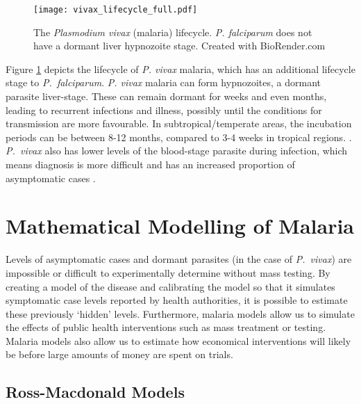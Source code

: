 \begin{figure}[htbp]
    \centering
    \texttt{[image: vivax\_lifecycle\_full.pdf]}
    \caption[{
        \emph{Plasmodium vivax} lifecycle
    }]{
        The \emph{Plasmodium vivax} (malaria) lifecycle. \emph{P. falciparum}
        does not have a dormant liver hypnozoite stage. Created with
        BioRender.com
    }
    \label{fig:mal_lc}
\end{figure}

Figure \ref{fig:mal_lc} depicts the lifecycle of \emph{P. vivax} malaria,
which has an additional lifecycle stage 
to \textit{P.\ falciparum}. \emph{P. vivax} malaria can form
hypnozoites, a
dormant parasite liver-stage. These can remain dormant for weeks and
even months, leading to recurrent infections and illness, possibly until the
conditions for transmission are more favourable. In subtropical/temperate
areas, the incubation periods can be between 8-12 months, compared to 3-4 weeks
in tropical regions. \cite{price_plasmodium_2020}. \textit{P.\ vivax} also has
lower levels of the blood-stage parasite during infection, which means
diagnosis is more difficult and has an increased proportion of 
asymptomatic
cases \parencite{adams_biology_2017}.

\section{Mathematical Modelling of Malaria}

Levels of asymptomatic cases and dormant parasites (in the case of
\textit{P.\ vivax}) are impossible or difficult to experimentally determine
without mass testing. By creating a model of the disease and calibrating the
model so that it simulates symptomatic case levels reported by health
authorities, it is possible to estimate these previously `hidden' levels.
Furthermore, malaria models allow us to simulate the effects of public health
interventions such as mass treatment or testing. Malaria models also allow
us to estimate how economical interventions will likely be
before large amounts of money are spent on trials.

\subsection*{Ross-Macdonald Models}

